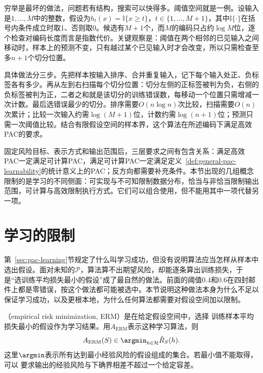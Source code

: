 穷举是最坏的做法，问题若有结构，搜索可以快得多。阈值空间就是一例。设输入是$1,\ldots,M$中的整数，假设为$h_t(x)=\mathbb I\{x\geq t\}$，$t\in\{1,\ldots,M+1\}$，其中$\mathbb I\{\cdot\}$在括号内条件成立时取1、否则取0。候选有$M+1$个，而$M$的编码只占约$\log M$位，逐个检查对编码长度而言是指数代价。关键观察是：阈值在两个相邻的已见输入之间移动时，样本上的预测不变，只有越过某个已见输入时才会改变，所以只需检查至多$n+1$个切分位置。

具体做法分三步。先把样本按输入排序、合并重复输入，记下每个输入处正、负标签各有多少。再从左到右扫描每个切分位置：切分左侧的正标签被判为负，右侧的负标签被判为正，二者之和就是该切分的训练错误数，每移动一个位置只需增减一次计数。最后选错误最少的切分。排序需要$O(n\log n)$次比较，扫描需要$O(n)$次累计；比较一次输入约需$\log(M+1)$位，计数约需$\log(n+1)$位；预测只需一次阈值比较。结合有限假设空间的样本界，这个算法在所述编码下满足高效PAC的要求。

固定风险目标、表示方式和输出范围后，三层要求之间有包含关系：满足高效PAC一定满足可计算PAC，满足可计算PAC一定满足定义~\ref{def:general-pac-learnability}的统计意义上的PAC；反方向都需要补充条件。本节出现的几组概念限制的是学习的不同侧面：可实现与不可知限制数据分布，恰当与非恰当限制输出范围，可计算与高效限制执行方式。它们可以组合使用，但不能用其中一项代替另一项。

\section{学习的限制}
\label{sec:limits-of-learning}

第~\ref{sec:pac-learning}节规定了什么叫学习成功，但没有说明算法应当怎样从样本中选出假设。面对未知的$\mathcal P$，算法算不出期望风险，却能逐条算出训练损失，于是“选训练平均损失最小的假设”成了最自然的做法。前面的阈值0.4和0.6在四封邮件上都是零错误，按这个做法都可能被选中。本节说明这种做法本身为什么不足以保证学习成功，以及更根本地，为什么任何算法都需要对假设空间加以限制。

\begin{definition}[经验风险最小化]
\label{def:erm-learning-rule}
（empirical risk minimization, ERM）是在给定假设空间中，选择
训练样本平均损失最小的假设作为学习结果。用$A_{\mathrm{ERM}}$表示这种学习算法，则
\begin{equation}
 A_{\mathrm{ERM}}(S)\in\argmin_{h\in\mathcal H}\hat R_S(h).
 \label{eq:erm-learning-rule}
\end{equation}
这里$\argmin$表示所有达到最小经验风险的假设组成的集合。若最小值不能取得，可以
要求输出的经验风险与下确界相差不超过一个给定容差。
\end{definition}

